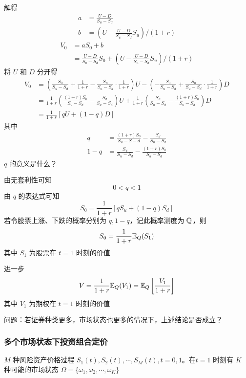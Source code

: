 解得
\[
\begin{aligned}
    a&=\frac{U-D}{S_u-S_d}\\
    b&=(U-\frac{U-D}{S_u-S_d}S_u)/(1+r)
\end{aligned}
\]
\[
\begin{aligned}
    V_0&=aS_0+b\\
    &=\frac{U-D}{S_u-S_d}S_0+(U-\frac{U-D}{S_u-S_d}S_u)/(1+r)
\end{aligned}
\]
将 $U$ 和 $D$ 分开得
\[
\begin{aligned}
    V_0&=\left(\frac{S_0}{S_u-S_d}+\frac{1}{1+r}-\frac{S_u}{S_u-S_d}\cdot \frac{1}{1+r}\right)U-\left(-\frac{S_0}{S_u-S_d}+\frac{S_u}{S_u-S_d}\cdot \frac{1}{1+r}\right)D\\
    &=\frac{1}{1+r}\left(\frac{(1+r)S_0}{S_u-S_d}-\frac{S_d}{S_u-S_d}\right)U+\frac{1}{1+r}\left(\frac{S_u}{S_u-S_d}-\frac{(1+r)S_0}{S_u-S_d}\right)D\\
    &=\frac{1}{1+r}[qU+(1-q)D]
\end{aligned}
\]
其中
\[
\begin{aligned}
    q&=\frac{(1+r)S_0}{S_u-S-d}-\frac{S_d}{S_u-S_d}\\
    1-q&=\frac{S_u}{S_u-S_d}-\frac{(1+r)S_0}{S_u-S_d}
\end{aligned}
\]
$q$ 的意义是什么？

由无套利性可知
\[
0<q<1
\]
由 $q$ 的表达式可知
\[
S_0=\frac{1}{1+r}[qS_u+(1-q)S_d]
\]
若令股票上涨、下跌的概率分别为 $q,1-q$，记此概率测度为 $\mathbb{Q}$，则
\[
S_0=\frac{1}{1+r}\mathbb E_Q(S_1)
\]
其中 $S_1$ 为股票在 $t=1$ 时刻的价值

进一步
\[
    V=\frac{1}{1+r}\mathbb E_Q(V_1)=\mathbb E_Q\left[\frac{V_1}{1+r} \right]
\]
其中 $V_1$ 为期权在 $t=1$ 时刻的价值

问题：若证券种类更多，市场状态也更多的情况下，上述结论是否成立？

\subsubsection{多个市场状态下投资组合定价}

$M$ 种风险资产价格过程 $S_1(t),S_2(t),\cdots,S_M(t), t=0,1$。在$t=1$ 时刻有 $K$ 种可能的市场状态 $\Omega=\{\omega_1,\omega_2,\cdots,\omega_K\}$

